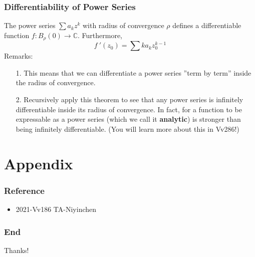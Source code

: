 \documentclass{beamer}
\begin{document}
\begin{frame}
    \frametitle{Differentiability of Power Series}
    \hspace{1em}
    The power series $\sum a_k z^k$ with radius of convergence $\rho$
    defines a differentiable function $f : B_\rho(0) \to \mathbb{C}$. Furthermore,
    $$f~'(z_0)=\sum k a_k z_0^{k-1}$$
    Remarks:
    \begin{itemize}
        \item[1.] This means that we can differentiate a power series ”term by term”
            inside the radius of convergence.
        \item[2.] Recursively apply this theorem to see that any power series is
            infinitely differentiable inside its radius of convergence. In fact, for a
            function to be expressable as a power series (which we call it
            \textbf{analytic}) is stronger than being infinitely differentiable. (You will
            learn more about this in Vv286!)
    \end{itemize}
\end{frame}





\section{Appendix}



\begin{frame}
    \frametitle{Reference}
    \begin{itemize}
        \item 2021-Vv186 TA-Niyinchen
    \end{itemize}
\end{frame}
\begin{frame}
    \frametitle{End}
    \centering
    \LARGE{Thanks!}


\end{frame}
\end{document}
